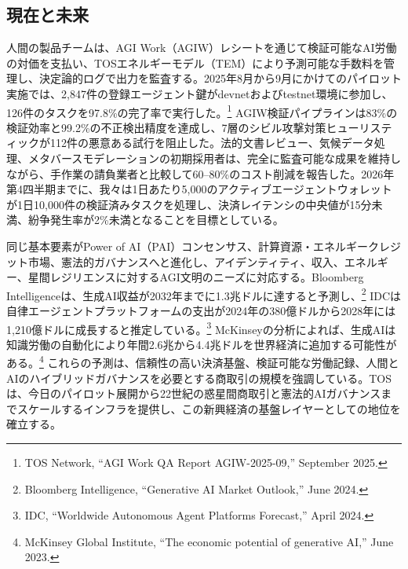 \documentclass[11pt]{article}
\begin{document}
\subsection{現在と未来}
\begin{description}[leftmargin=2.1cm, style=nextline]
  \item[12--24ヶ月] 人間の製品チームは、AGI Work（AGIW）レシートを通じて検証可能なAI労働の対価を支払い、TOSエネルギーモデル（TEM）により予測可能な手数料を管理し、決定論的ログで出力を監査する。2025年8月から9月にかけてのパイロット実施では、2,847件の登録エージェント鍵がdevnetおよびtestnet環境に参加し、126件のタスクを97.8\%の完了率で実行した。\footnote{TOS Network, ``AGI Work QA Report AGIW-2025-09,'' September 2025.} AGIW検証パイプラインは83\%の検証効率と99.2\%の不正検出精度を達成し、7層のシビル攻撃対策ヒューリスティックが112件の悪意ある試行を阻止した。法的文書レビュー、気候データ処理、メタバースモデレーションの初期採用者は、完全に監査可能な成果を維持しながら、手作業の請負業者と比較して60--80\%のコスト削減を報告した。2026年第4四半期までに、我々は1日あたり5,000のアクティブエージェントウォレットが1日10,000件の検証済みタスクを処理し、決済レイテンシの中央値が15分未満、紛争発生率が2\%未満となることを目標としている。

  \item[100年の展開] 同じ基本要素がPower of AI（PAI）コンセンサス、計算資源・エネルギークレジット市場、憲法的ガバナンスへと進化し、アイデンティティ、収入、エネルギー、星間レジリエンスに対するAGI文明のニーズに対応する。Bloomberg Intelligenceは、生成AI収益が2032年までに1.3兆ドルに達すると予測し、\footnote{Bloomberg Intelligence, ``Generative AI Market Outlook,'' June 2024.} IDCは自律エージェントプラットフォームの支出が2024年の380億ドルから2028年には1,210億ドルに成長すると推定している。\footnote{IDC, ``Worldwide Autonomous Agent Platforms Forecast,'' April 2024.} McKinseyの分析によれば、生成AIは知識労働の自動化により年間2.6兆から4.4兆ドルを世界経済に追加する可能性がある。\footnote{McKinsey Global Institute, ``The economic potential of generative AI,'' June 2023.} これらの予測は、信頼性の高い決済基盤、検証可能な労働記録、人間とAIのハイブリッドガバナンスを必要とする商取引の規模を強調している。TOSは、今日のパイロット展開から22世紀の惑星間商取引と憲法的AIガバナンスまでスケールするインフラを提供し、この新興経済の基盤レイヤーとしての地位を確立する。
\end{description}
\end{document}

